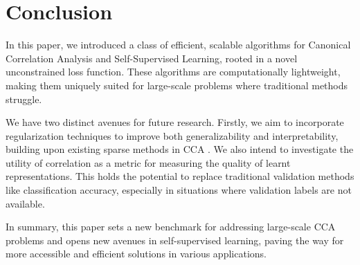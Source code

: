 \section{Conclusion}

In this paper, we introduced a class of efficient, scalable algorithms for Canonical Correlation Analysis and Self-Supervised Learning, rooted in a novel unconstrained loss function. These algorithms are computationally lightweight, making them uniquely suited for large-scale problems where traditional methods struggle.

We have two distinct avenues for future research. Firstly, we aim to incorporate regularization techniques to improve both generalizability and interpretability, building upon existing sparse methods in CCA \citep{witten2009extensions}. We also intend to investigate the utility of correlation as a metric for measuring the quality of learnt representations. This holds the potential to replace traditional validation methods like classification accuracy, especially in situations where validation labels are not available.

In summary, this paper sets a new benchmark for addressing large-scale CCA problems and opens new avenues in self-supervised learning, paving the way for more accessible and efficient solutions in various applications.
